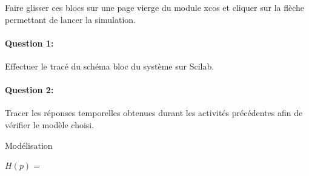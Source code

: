 Faire glisser ces blocs sur une page vierge du module xcos et cliquer sur la flèche permettant de lancer la simulation.

\paragraph{Question 1:} Effectuer le tracé du schéma bloc du système sur Scilab.

\paragraph{Question 2:} Tracer les réponses temporelles obtenues durant les activités précédentes afin de vérifier le modèle choisi.

\ifdef{\public}{}{}

\newpage

\pagestyle{correction}\setcounter{section}{0}

Modélisation
\begin{center}
$H(p)=$
\end{center}

